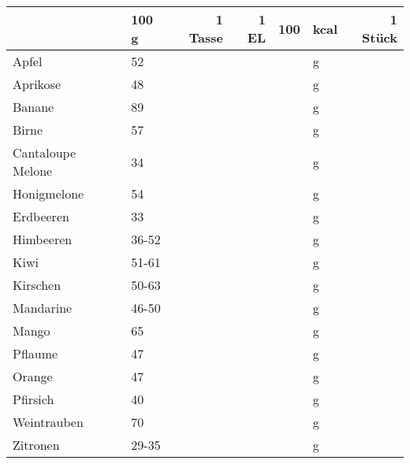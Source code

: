 \begin{tabularx}{\linewidth}{X|l|r|r|rl|r}
                  &   100 g & 1 Tasse & 1 EL &      100 & kcal    & 1 Stück  \\
\hline
Apfel             &      52 &         &      &          & g       &          \\
Aprikose          &      48 &         &      &          & g       &          \\
Banane            &      89 &         &      &          & g       &          \\
Birne             &      57 &         &      &          & g       &          \\
Cantaloupe Melone &      34 &         &      &          & g       &          \\
Honigmelone       &      54 &         &      &          & g       &          \\
Erdbeeren         &      33 &         &      &          & g       &          \\
Himbeeren         &   36-52 &         &      &          & g       &          \\
Kiwi              &   51-61 &         &      &          & g       &          \\
Kirschen          &   50-63 &         &      &          & g       &          \\
Mandarine         &   46-50 &         &      &          & g       &          \\
Mango             &      65 &         &      &          & g       &          \\
Pflaume           &      47 &         &      &          & g       &          \\
Orange            &      47 &         &      &          & g       &          \\
Pfirsich          &      40 &         &      &          & g       &          \\
Weintrauben       &      70 &         &      &          & g       &          \\
Zitronen          &   29-35 &         &      &          & g       &          \\
\end{tabularx}
